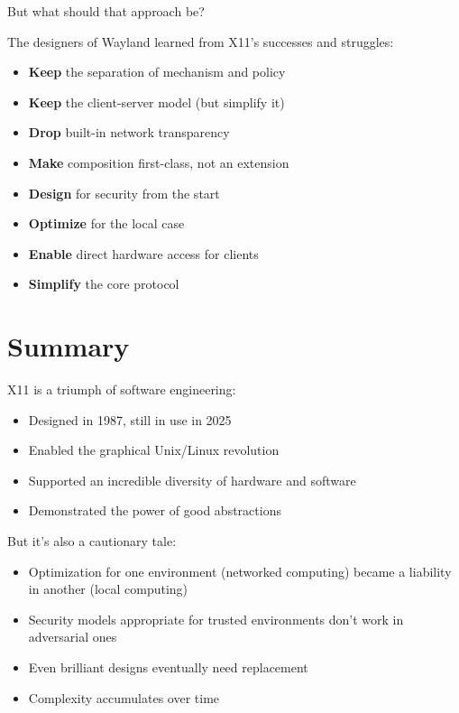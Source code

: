 But what should that approach be?

The designers of Wayland learned from X11's successes and struggles:

\begin{itemize}[leftmargin=*]
    \item \textbf{Keep} the separation of mechanism and policy
    \item \textbf{Keep} the client-server model (but simplify it)
    \item \textbf{Drop} built-in network transparency
    \item \textbf{Make} composition first-class, not an extension
    \item \textbf{Design} for security from the start
    \item \textbf{Optimize} for the local case
    \item \textbf{Enable} direct hardware access for clients
    \item \textbf{Simplify} the core protocol
\end{itemize}

\section{Summary}

X11 is a triumph of software engineering:

\begin{itemize}[leftmargin=*]
    \item Designed in 1987, still in use in 2025
    \item Enabled the graphical Unix/Linux revolution
    \item Supported an incredible diversity of hardware and software
    \item Demonstrated the power of good abstractions
\end{itemize}

But it's also a cautionary tale:

\begin{itemize}[leftmargin=*]
    \item Optimization for one environment (networked computing) became a liability in another (local computing)
    \item Security models appropriate for trusted environments don't work in adversarial ones
    \item Even brilliant designs eventually need replacement
    \item Complexity accumulates over time
\end{itemize}

